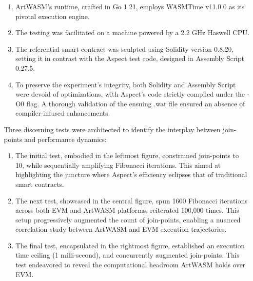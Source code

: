 \begin{enumerate}
  \item ArtWASM's runtime, crafted in Go 1.21, employs WASMTime v11.0.0 as its pivotal execution engine.
  \item The testing was facilitated on a machine powered by a 2.2 GHz Haswell CPU.
  \item The referential smart contract was sculpted using Solidity version 0.8.20, setting it in contrast with the Aspect test code, designed in Assembly Script 0.27.5.
  \item To preserve the experiment's integrity, both Solidity and Assembly Script were devoid of optimizations, with Aspect's code strictly compiled under the -O0 flag. A thorough validation of the ensuing .wat file ensured an absence of compiler-infused enhancements.
\end{enumerate}

Three discerning tests were architected to identify the interplay between join-points and performance dynamics:

\begin{enumerate}
  \item The initial test, embodied in the leftmost figure, constrained join-points to 10, while sequentially amplifying Fibonacci iterations. This aimed at highlighting the juncture where Aspect's efficiency eclipses that of traditional smart contracts.
  \item The next test, showcased in the central figure, spun 1600 Fibonacci iterations across both EVM and ArtWASM platforms, reiterated 100,000 times. This setup progressively augmented the count of join-points, enabling a nuanced correlation study between ArtWASM and EVM execution trajectories.
  \item The final test, encapsulated in the rightmost figure, established an execution time ceiling (1 milli-second), and concurrently augmented join-points. This test endeavored to reveal the computational headroom ArtWASM holds over EVM.
\end{enumerate}

